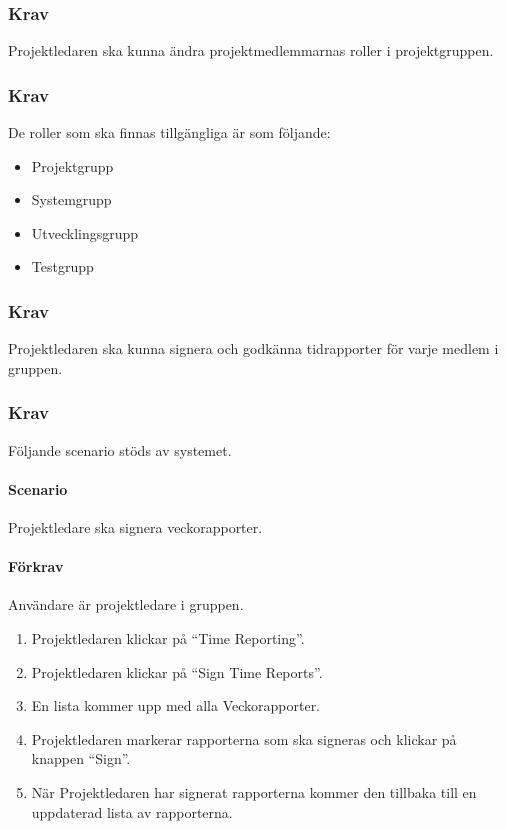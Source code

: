\documentclass[paper=a4, fontsize=11pt,twoside]{article}
\begin{document}
\subsubsection{Krav}
	Projektledaren ska kunna ändra projektmedlemmarnas roller i projektgruppen.
\paragraph{}
\subsubsection{Krav}
De roller som ska finnas tillgängliga är som följande:
\begin{itemize}
\item Projektgrupp
\item Systemgrupp
\item Utvecklingsgrupp
\item Testgrupp
\end{itemize}

\subsubsection{Krav}
Projektledaren ska kunna signera och godkänna tidrapporter för varje medlem i gruppen.

\paragraph{}

\subsubsection{Krav}
Följande scenario stöds av systemet.
\paragraph{Scenario}
Projektledare ska signera veckorapporter.
\paragraph{Förkrav}
Användare är projektledare i gruppen.
\begin{enumerate}
\item Projektledaren klickar på “Time Reporting”.
\item Projektledaren klickar på “Sign Time Reports”.
\item En lista kommer upp med alla Veckorapporter.
\item Projektledaren markerar rapporterna som ska signeras och klickar på knappen “Sign”.
\item När Projektledaren har signerat rapporterna kommer den tillbaka till en uppdaterad lista av rapporterna.
\end{enumerate}
\end{document}
